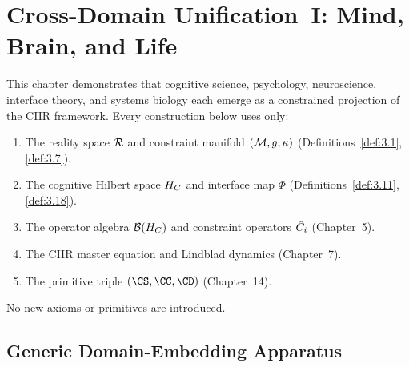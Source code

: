 
\chapter{Cross-Domain Unification~I: Mind, Brain, and Life}
\label{ch:cross-domain-I}

\vspace{0.5em}
\noindent
This chapter demonstrates that cognitive science, psychology, neuroscience,
interface theory, and systems biology each emerge as a constrained projection
of the CIIR framework.  Every construction below uses only:
\begin{enumerate}
  \item The reality space $\mathcal{R}$ and constraint manifold $(\mathcal{M}, g, \kappa)$
        (Definitions~\ref{def:3.1}, \ref{def:3.7}).
  \item The cognitive Hilbert space $H_C$ and interface map $\Phi$
        (Definitions~\ref{def:3.11}, \ref{def:3.18}).
  \item The operator algebra $\mathcal{B}(H_C)$ and constraint operators $\hat{C}_i$
        (Chapter~5).
  \item The CIIR master equation and Lindblad dynamics (Chapter~7).
  \item The primitive triple $(\CS, \CC, \CD)$ (Chapter~14).
\end{enumerate}

No new axioms or primitives are introduced.

\section{Generic Domain-Embedding Apparatus}
\label{sec:ch16:apparatus}

